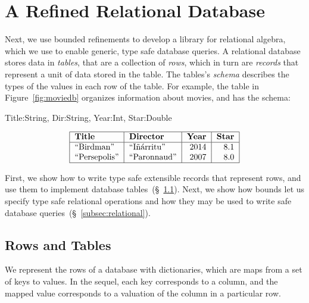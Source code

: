 \section{A Refined Relational Database}\label{sec:database}

Next, we use bounded refinements to develop a library
for relational algebra, which we use to enable generic,
type safe database queries.
%
A relational database stores data in \emph{tables},
that are a collection of \emph{rows}, which in turn 
are \emph{records} that represent a unit of data 
stored in the table.
The tables's \textit{schema} describes the types of 
the values in each row of the table.
For example, the table in Figure~\ref{fig:moviedb} organizes 
information about movies, and has the schema:
%
\begin{code}
 Title:String, Dir:String, Year:Int, Star:Double
\end{code}

\begin{table}[t]
$$
\begin{tabular}{| l | l| r | r |}
  \hline
  \textbf{Title} & \textbf{Director} & \textbf{Year} & \textbf{Star} \\
  \hline  
  ``Birdman'' & ``I\~{n}\'{a}rritu''   & 2014 & 8.1\\
  ``Persepolis''  & ``Paronnaud'' & 2007 & 8.0 \\ 
  \hline
\end{tabular}
$$
\caption{Example entries for Movies Database.}
\label{fig:moviedb} 
\end{table}

First, we show how to write type safe extensible 
records  that represent rows, and use them to 
implement database tables~(\S~\ref{subsec:records}). 
%
Next, we show how bounds let us specify type 
safe relational operations and how they may be 
used to write safe database queries~(\S~\ref{subsec:relational}).

\subsection{Rows and Tables}\label{subsec:records}

We represent the rows of a database with dictionaries, 
which are maps from a set of keys to values.
In the sequel, each key corresponds to a column, and 
the mapped value corresponds to a valuation of the column 
in a particular row.

